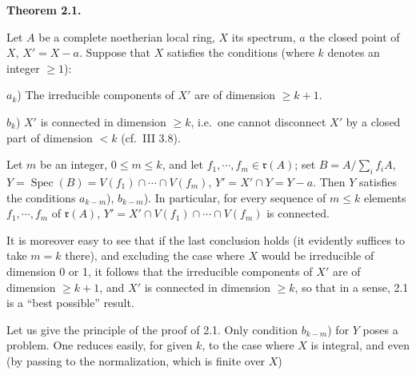 \documentclass[
]{article}
\begin{document}
\textbf{Theorem 2.1.}

Let \(A\) be a complete noetherian local ring, \(X\) its spectrum, \(a\)
the closed point of \(X\), \(X' = X - {a}\). Suppose that \(X\)
satisfies the conditions (where \(k\) denotes an integer
\(\geqslant 1\)):

\(a_{k}\)) The irreducible components of \(X'\) are of dimension
\(\geqslant k + 1\).

\(b_{k}\)) \(X'\) is connected in dimension \(\geqslant k\), i.e.~one
cannot disconnect \(X'\) by a closed part of dimension \(< k\) (cf.~III
3.8).

Let \(m\) be an integer, \(0 \leqslant m \leqslant k\), and let
\(f_{1}, \cdots, f_{m} \in \mathfrak{r}(A)\); set
\(B = A / \sum_{i} f_{i}A\),
\(Y = \operatorname{Spec}(B) = V(f_{1}) \cap \cdots \cap V(f_{m})\),
\(Y' = X' \cap Y = Y - {a}\). Then \(Y\) satisfies the conditions
\(a_{k-m}\)), \(b_{k-m}\)). In particular, for every sequence of
\(m \leqslant k\) elements \(f_{1}, \cdots, f_{m}\) of
\(\mathfrak{r}(A)\), \(Y' = X' \cap V(f_{1}) \cap \cdots \cap V(f_{m})\)
is connected.

It is moreover easy to see that if the last conclusion holds (it
evidently suffices to take \(m = k\) there), and excluding the case
where \(X\) would be irreducible of dimension 0 or 1, it follows that
the irreducible components of \(X'\) are of dimension
\(\geqslant k + 1\), and \(X'\) is connected in dimension
\(\geqslant k\), so that in a sense, 2.1 is a ``best possible'' result.

Let us give the principle of the proof of 2.1. Only condition
\(b_{k-m}\)) for \(Y\) poses a problem. One reduces easily, for given
\(k\), to the case where \(X\) is integral, and even (by passing to the
normalization, which is finite over \(X\))
\end{document}
